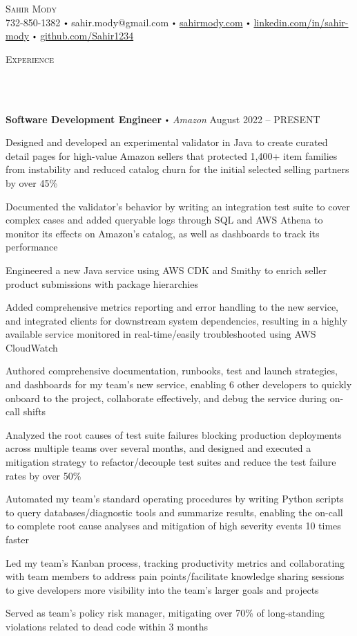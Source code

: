 \documentclass{article}
\newcommand{\contact}[3]{
\vspace*{3pt}
\begin{center}
{\Huge \scshape {#1}}\\
\vspace{0pt}
#2 
\vspace{0pt}
#3
\end{center}
\vspace*{-3pt}
}
\newcommand{\header}[1]{{
\hspace*{-15pt}\vspace*{10pt} \large \scshape{#1}} \vspace*{-6pt} 
\lineunder
}
\newcommand{\lineunder}{
\vspace*{-8pt} \\ \hspace*{-18pt} 
\hrulefill \\
}
\newcommand{\employer}[4]{
\textbf{#1} \labelitemi \textit{#2} \hfill #3 \\ #4 \vspace*{3pt}
}
\renewcommand{\labelitemi}{
$\vcenter{\hbox{\tiny$\bullet$}}$\hspace*{3pt}
}
\renewcommand{\labelitemii}{
$\vcenter{\hbox{\tiny$\bullet$}}$\hspace*{-3pt}
}
\newenvironment{bullet-list-minor}{
\begin{list}{\labelitemii}{\setlength\leftmargin{15pt} 
\topsep 0pt \itemsep 1pt}}{\vspace*{4pt}\end{list}
}
\begin{document}
\small
\vspace*{-64pt}

\contact{Sahir Mody}\bigskip
{{732-850-1382}\labelitemi{sahir.mody@gmail.com}\labelitemi\href{https://sahirmody.com}{sahirmody.com}\labelitemi\href{https://www.linkedin.com/in/sahir-mody}{linkedin.com/in/sahir-mody}  \labelitemi\href{https://www.github.com/Sahir1234}{github.com/Sahir1234}}
\medskip
\header{Experience}
    \vspace{4pt}
    \employer{Software Development Engineer}{Amazon}{August 2022 -- PRESENT}{}
	\begin{bullet-list-minor}
        \item Designed and developed an experimental validator in Java to create curated detail pages for high-value Amazon sellers that protected 1,400+ item families from instability and reduced catalog churn for the initial selected selling partners by over 45\%
        \item Documented the validator's behavior by writing an integration test suite to cover complex cases and added queryable logs through SQL and AWS Athena to monitor its effects on Amazon's catalog, as well as dashboards to track its performance
        \item Engineered a new Java service using AWS CDK and Smithy to enrich seller product submissions with package hierarchies
        \item Added comprehensive metrics reporting and error handling to the new service, and integrated clients for downstream system dependencies, resulting in a highly available service monitored in real-time/easily troubleshooted using AWS CloudWatch
        \item Authored comprehensive documentation, runbooks, test and launch strategies, and dashboards for my team's new service, enabling 6 other developers to quickly onboard to the project, collaborate effectively, and debug the service during on-call shifts
        \item Analyzed the root causes of test suite failures blocking production deployments across multiple teams over several months, and designed and executed a mitigation strategy to refactor/decouple test suites and reduce the test failure rates by over 50\%
        \item Automated my team's standard operating procedures by writing Python scripts to query databases/diagnostic tools and summarize results, enabling the on-call to complete root cause analyses and mitigation of high severity events 10 times faster
        \item Led my team's Kanban process, tracking productivity metrics and collaborating with team members to address pain points/facilitate knowledge sharing sessions to give developers more visibility into the team's larger goals and projects
        \item Served as team's policy risk manager, mitigating over 70\% of long-standing violations related to dead code within 3 months
    \end{bullet-list-minor}
    \medskip
    
\end{document}
